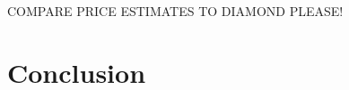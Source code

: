 \documentclass[12pt]{article}
\begin{document}



COMPARE PRICE ESTIMATES TO DIAMOND PLEASE!





\section{Conclusion}\label{section:discussion}
\end{document}
